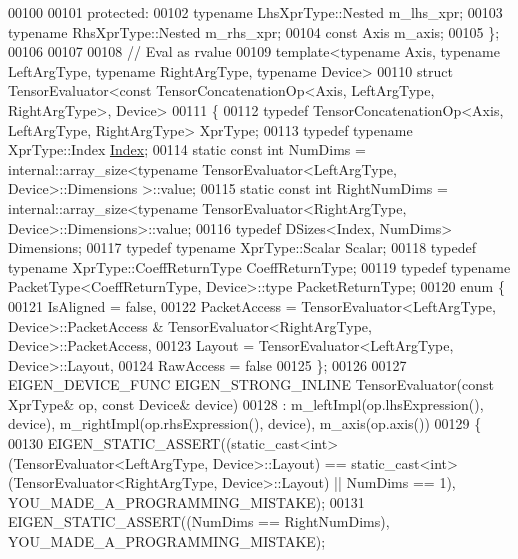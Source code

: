 \begin{DoxyCode}
00100 
00101   \textcolor{keyword}{protected}:
00102     \textcolor{keyword}{typename} LhsXprType::Nested m\_lhs\_xpr;
00103     \textcolor{keyword}{typename} RhsXprType::Nested m\_rhs\_xpr;
00104     \textcolor{keyword}{const} Axis m\_axis;
00105 \};
00106 
00107 
00108 \textcolor{comment}{// Eval as rvalue}
00109 \textcolor{keyword}{template}<\textcolor{keyword}{typename} Axis, \textcolor{keyword}{typename} LeftArgType, \textcolor{keyword}{typename} RightArgType, \textcolor{keyword}{typename} Device>
00110 \textcolor{keyword}{struct }TensorEvaluator<const TensorConcatenationOp<Axis, LeftArgType, RightArgType>, Device>
00111 \{
00112   \textcolor{keyword}{typedef} TensorConcatenationOp<Axis, LeftArgType, RightArgType> XprType;
00113   \textcolor{keyword}{typedef} \textcolor{keyword}{typename} XprType::Index \hyperlink{namespace_eigen_a62e77e0933482dafde8fe197d9a2cfde}{Index};
00114   \textcolor{keyword}{static} \textcolor{keyword}{const} \textcolor{keywordtype}{int} NumDims = internal::array\_size<typename TensorEvaluator<LeftArgType, Device>::Dimensions
      >::value;
00115   \textcolor{keyword}{static} \textcolor{keyword}{const} \textcolor{keywordtype}{int} RightNumDims = internal::array\_size<typename TensorEvaluator<RightArgType,
       Device>::Dimensions>::value;
00116   \textcolor{keyword}{typedef} DSizes<Index, NumDims> Dimensions;
00117   \textcolor{keyword}{typedef} \textcolor{keyword}{typename} XprType::Scalar Scalar;
00118   \textcolor{keyword}{typedef} \textcolor{keyword}{typename} XprType::CoeffReturnType CoeffReturnType;
00119   \textcolor{keyword}{typedef} \textcolor{keyword}{typename} PacketType<CoeffReturnType, Device>::type PacketReturnType;
00120   \textcolor{keyword}{enum} \{
00121     IsAligned = \textcolor{keyword}{false},
00122     PacketAccess = TensorEvaluator<LeftArgType, Device>::PacketAccess & TensorEvaluator<RightArgType,
       Device>::PacketAccess,
00123     Layout = TensorEvaluator<LeftArgType, Device>::Layout,
00124     RawAccess = \textcolor{keyword}{false}
00125   \};
00126 
00127   EIGEN\_DEVICE\_FUNC EIGEN\_STRONG\_INLINE TensorEvaluator(\textcolor{keyword}{const} XprType& op, \textcolor{keyword}{const} Device& device)
00128     : m\_leftImpl(op.lhsExpression(), device), m\_rightImpl(op.rhsExpression(), device), m\_axis(op.axis())
00129   \{
00130     EIGEN\_STATIC\_ASSERT((static\_cast<int>(TensorEvaluator<LeftArgType, Device>::Layout) == static\_cast<int>
      (TensorEvaluator<RightArgType, Device>::Layout) || NumDims == 1), YOU\_MADE\_A\_PROGRAMMING\_MISTAKE);
00131     EIGEN\_STATIC\_ASSERT((NumDims == RightNumDims), YOU\_MADE\_A\_PROGRAMMING\_MISTAKE);

\end{DoxyCode}

